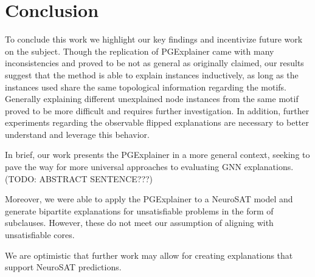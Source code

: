\chapter{Conclusion}

To conclude this work we highlight our key findings and incentivize future work on the subject.
Though the replication of PGExplainer came with many inconsistencies and proved to be not as general as originally claimed, our results suggest that the method is able to explain instances inductively, as long as the instances used share the same topological information regarding the motifs. Generally explaining different unexplained node instances from the same motif proved to be more difficult and requires further investigation. In addition, further experiments regarding the observable flipped explanations are necessary to better understand and leverage this behavior. 

In brief, our work presents the PGExplainer in a more general context, seeking to pave the way for more universal approaches to evaluating GNN explanations. (TODO: ABSTRACT SENTENCE???)

Moreover, we were able to apply the PGExplainer to a NeuroSAT model and generate bipartite explanations for unsatisfiable problems in the form of subclauses. However, these do not meet our assumption of aligning with unsatisfiable cores. 

We are optimistic that further work may allow for creating explanations that support NeuroSAT predictions.